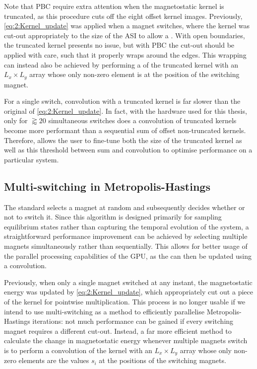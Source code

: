 Note that PBC require extra attention when the magnetostatic kernel is truncated, as this procedure cuts off the eight offset kernel images.
Previously, \cref{eq:2:Kernel_update} was applied when a magnet switches, where the kernel was cut-out appropriately to the size of the ASI to allow a .
With open boundaries, the truncated kernel presents no issue, but with PBC the cut-out should be applied with care, such that it properly wraps around the edges.
This wrapping can instead also be achieved by performing a  of the truncated kernel with an $L_x \times L_y$ array whose only non-zero element is at the position of the switching magnet. \par
For a single switch, convolution with a truncated kernel is far slower than the original  of \eqref{eq:2:Kernel_update}.
In fact, with the hardware used for this thesis, only for $\gtrapprox 20$ simultaneous switches does a convolution of truncated kernels become more performant than a sequential sum of offset non-truncated kernels.
Therefore, \hotspice allows the user to fine-tune both the size of the truncated kernel as well as this threshold between sum and convolution to optimise performance on a particular system.

\subsection{Multi-switching in Metropolis-Hastings} \label{sec:2:MultiSwitch}
The standard  selects a magnet at random and subsequently decides whether or not to switch it.
Since this algorithm is designed primarily for sampling equilibrium states rather than capturing the temporal evolution of the system, a straightforward performance improvement can be achieved by selecting multiple magnets simultaneously rather than sequentially.
This allows for better usage of the parallel processing capabilities of the GPU, as the  can then be updated using a convolution. \par
Previously, when only a single magnet switched at any instant, the magnetostatic energy was updated by \cref{eq:2:Kernel_update}, which appropriately cut out a piece of the kernel for pointwise multiplication.
This process is no longer usable if we intend to use multi-switching as a method to efficiently parallelise Metropolis-Hastings iterations: not much performance can be gained if every switching magnet requires a different cut-out.
Instead, a far more efficient method to calculate the change in magnetostatic energy whenever multiple magnets switch is to perform a convolution of the kernel with an $L_x \times L_y$ array whose only non-zero elements are the values $s_i$ at the positions of the switching magnets.

